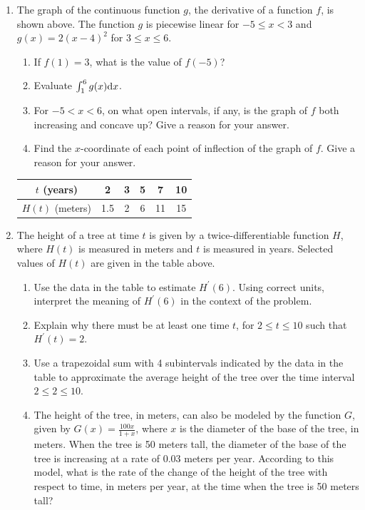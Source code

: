 \begin{enumerate}
	\item
		The graph of the continuous function $g$, the derivative of a function $f$, is shown above.
		The function $g$ is piecewise linear for $-5 \leq x < 3$ and $g(x)=2(x-4)^2$ for $3 \leq x \leq 6$.
		\begin{enumerate}
			\item If $f(1)=3$, what is the value of $f(-5)$?
			\item Evaluate $\int_{1}^{6}{g(x)\mathrm{d} x}$.
			\item For $-5 < x < 6$, on what open intervals, if any, is the graph of $f$ both increasing and concave up?
				Give a reason for your answer.
			\item Find the $x$-coordinate of each point of inflection of the graph of $f$.
				Give a reason for your answer.
		\end{enumerate}
	
		\begin{table}[H]
			\begin{center}
				\begin{tabular}{|c||c|c|c|c|c|}
					\hline
					$t$ (years) & 2 & 3 & 5 & 7 & 10 \\
					\hline
					$H(t)$ (meters) & 1.5 & 2 & 6 & 11 & 15 \\
					\hline
				\end{tabular}
			\end{center}
		\end{table}
	
	\item The height of a tree at time $t$ is given by a twice-differentiable function $H$, where $H(t)$ is measured in meters and $t$ is measured in years.
		Selected values of $H(t)$ are given in the table above.
		\begin{enumerate}
			\item Use the data in the table to estimate $H^\prime(6)$.
				Using correct units, interpret the meaning of $H^\prime(6)$ in the context of the problem.
			\item Explain why there must be at least one time $t$, for $2 \leq t \leq 10$ such that $H^\prime(t) = 2$.
			\item Use a trapezoidal sum with 4 subintervals indicated by the data in the table to approximate the average height of the tree over the time interval $2 \leq 2 \leq 10$.
			\item The height of the tree, in meters, can also be modeled by the function $G$, given by $G(x)=\frac{100x}{1+x}$, where $x$ is the diameter of the base of the tree, in meters.
				When the tree is 50 meters tall, the diameter of the base of the tree is increasing at a rate of 0.03 meters per year.
				According to this model, what is the rate of the change of the height of the tree with respect to time, in meters per year, at the time when the tree is 50 meters tall?
		\end{enumerate}
	

\end{enumerate}
